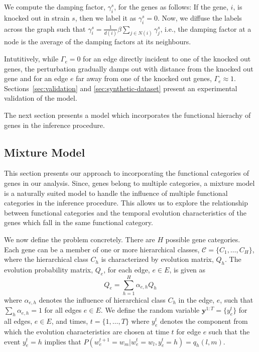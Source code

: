 \documentclass{bioinfo}
\begin{document}
\begin{methods}
We compute the damping factor, $\gamma^s_i$, for the genes
as follows: If the gene, $i$, is knocked out in strain $s$, then we
label it as $\gamma^s_i=0$. Now, we diffuse the labels across the
graph  such that $\gamma^{s}_i = \frac{1}{d(i)} \beta
\sum_{j\in N(i)} \gamma_j^s$, i.e., the damping factor at a node is
the average of the damping factors at its neighbours.    

 Intutitively, while $\Gamma_e = 0$ for an edge 
directly incident to one of the knocked out genes, the perturbation
gradually damps out with distance from the knocked out gene and for
an edge $e$ far away from one of the knocked out genes, $\Gamma_e
\approx 1$. Sections~\ref{sec:validation} and
\ref{sec:synthetic-dataset} present an experimental validation of the
model.

The next section presents a model which incorporates the functional
hierachy of genes in the inference procedure. 

\subsection{Mixture Model}
\label{sec:mixture-model}
This section presents our approach to incorporating the
  functional categories of genes in our analysis. Since, genes belong
  to multiple categories, a mixture model is a naturally suited model
  to handle the influence of multiple functional categories in the
  inference procedure. 
This allows us to explore  the relationship between functional
categories and the temporal evolution characteristics of the genes
which fall in the same functional category.

We now define the problem concretely. There are $H$ possible gene
categories. Each gene can be a member of one or more hierarchical
classes, $\mathcal{C}=\{C_{1},\ldots , C_{H}\}$, where the
hierarchical class $C_{h}$ is characterized by evolution matrix,
$Q_{h}$. The evolution probability matrix, $Q_{e}$, for each edge,
$e\in E$, is given as 
\begin{equation}
  \label{eq:q-mixture}
  Q_{e} = \sum_{h=1}^{H} \alpha_{e,h} Q_{h}
\end{equation}
where $\alpha_{e,h}$ denotes the influence of hierarchical class
$C_{h}$ in the edge, $e$, such that $\sum_{h} \alpha_{e, h} = 1$
for all edges $e \in E$. We define the random variable
$\mathbf{y}^{1:T} = \{y_e^t\}$ for all edges, $e \in E$,  and times,
$t=\{1,\ldots, T\}$ where $y^t_e$
denotes the component from which the evolution characteristics are
chosen at time $t$ for edge $e$ such that the event $y_e^t = h$
implies that $P(w_e^{t+1}= w_m | w^t_e =w_l, y_e^t = h) = q_h(l, m)$.


\end{methods}
\end{document}

